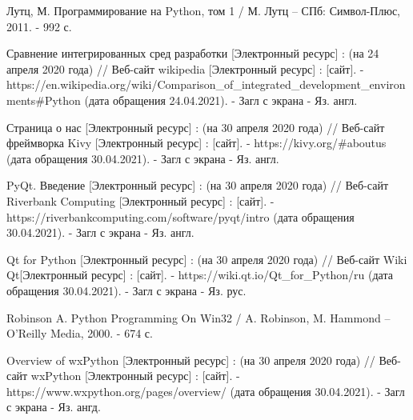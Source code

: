 \documentclass[14pt]{extreport}
\begin{document}
\begin{thebibliography}{9}
Лутц, М. Программирование на Python, том 1 / М. Лутц -- СПб: Символ-Плюс, 2011. - 992 с.

Сравнение интегрированных сред разработки [Электронный ресурс] : (на 24 апреля 2020 года) // Веб-сайт wikipedia [Электронный ресурс] : [сайт]. - https://en.wikipedia.org/wiki/Comparison\_of\_integrated\_development\_environments\#Python (дата обращения 24.04.2021). - Загл с экрана - Яз. англ.

Страница о нас [Электронный ресурс] : (на 30 апреля 2020 года) // Веб-сайт фреймворка Kivy [Электронный ресурс] : [сайт]. - https://kivy.org/\#aboutus (дата обращения 30.04.2021). - Загл с экрана - Яз. англ.

PyQt. Введение [Электронный ресурс] : (на 30 апреля 2020 года) // Веб-сайт Riverbank Computing [Электронный ресурс] : [сайт]. - https://riverbankcomputing.com/software/pyqt/intro (дата обращения 30.04.2021). - Загл с экрана - Яз. англ.

Qt for Python [Электронный ресурс] : (на 30 апреля 2020 года) // Веб-сайт Wiki Qt[Электронный ресурс] : [сайт]. - https://wiki.qt.io/Qt\_for\_Python/ru (дата обращения 30.04.2021). - Загл с экрана - Яз. рус.

Robinson A. Python Programming On Win32 / A. Robinson, M. Hammond -- O'Reilly Media, 2000. - 674 с.

Overview of wxPython [Электронный ресурс] : (на 30 апреля 2020 года) // Веб-сайт wxPython [Электронный ресурс] : [сайт]. - https://www.wxpython.org/pages/overview/ (дата обращения 30.04.2021). - Загл с экрана - Яз. ангд.



\end{thebibliography}


\end{document}
